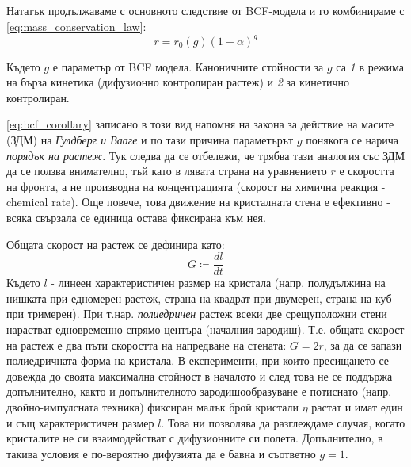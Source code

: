 Нататък продължаваме с основното следствие от BCF-модела \cite{BCF1951} и го комбинираме с \autoref{eq:mass_conservation_law}:
\begin{equation}
	\label{eq:bcf_corollary}
	r = r_0(g)(1-\alpha)^g
\end{equation}

\noindent Където $g$ е параметър от BCF модела. Каноничните стойности за $g$ са \textit{1} в режима на бърза кинетика (дифузионно контролиран растеж) и \textit{2} за кинетично контролиран.

\autoref{eq:bcf_corollary} записано в този вид напомня на закона за действие на масите (ЗДМ) на  \textit{Гулдберг и Вааге} и по тази причина параметърът $g$ понякога се нарича \textit{порядък на растеж}. Тук следва да се отбележи, че трябва тази аналогия със ЗДМ да се ползва внимателно, тъй като в лявата страна на уравнението $r$ е скоростта на фронта, а не производна на концентрацията (скорост на химична реакция - chemical rate). Още повече, това движение на кристалната стена е ефективно - всяка свързала се единица остава фиксирана към нея.

\noindent Общата скорост на растеж се дефинира като:
\begin{equation}
	\label{eq:overall_growth_rate}
	G \coloneqq \frac{dl}{dt}
\end{equation}
Където $l$ - линеен характеристичен размер на кристала (напр. полудължина на нишката при едномерен растеж, страна на квадрат при двумерен, страна на куб при тримерен).
При т.нар. \textit{полиедричен} растеж всеки две срещуположни стени нарастват едновременно спрямо центъра (началния зародиш). Т.е. общата скорост на растеж е два пъти скоростта на напредване на стената: $G = 2r$, за да се запази полиедричната форма на кристала.
В експерименти, при които пресищането се довежда до своята максимална стойност в началото и след това не се поддържа допълнително, както и допълнителното зародишообразуване е потиснато (напр. двойно-импулсната техника) фиксиран малък брой кристали $\eta$ растат и имат един и същ характеристичен размер $l$. Това ни позволява да разглеждаме случая, когато кристалите не си взаимодействат с дифузионните си полета. Допълнително, в такива условия е по-вероятно дифузията да е бавна и съответно $g = 1$.

